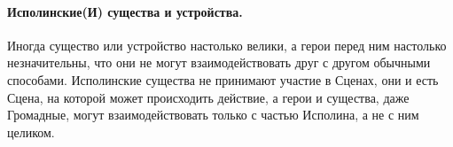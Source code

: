 \paragraph{Исполинские(И) существа и устройства.} Иногда существо или устройство настолько велики, а герои перед ним настолько незначительны, что они не могут взаимодействовать друг с другом обычными способами. Исполинские существа не принимают участие в Сценах, они и есть Сцена, на которой может происходить действие, а герои и существа, даже Громадные, могут взаимодействовать только с частью Исполина, а не с ним целиком.